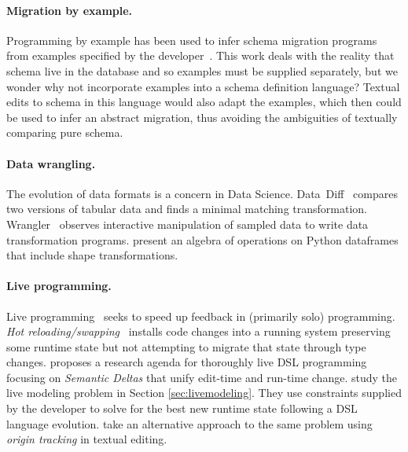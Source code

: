 \documentclass[english,submission]{programming}
\begin{document}
\paragraph{Migration by example.}
Programming by example has been used to infer schema migration programs from examples specified by the developer~\cite{wang20, Alexe11}.
This work deals with the reality that schema live in the database and so examples must be supplied separately, but we wonder why not incorporate examples into a schema definition language? Textual edits to schema in this language would also adapt the examples, which then could be used to infer an abstract migration, thus avoiding the ambiguities of textually comparing pure schema.

\paragraph{Data wrangling.} The evolution of data formats is a concern in Data Science. Data~Diff~\cite{sutton18} compares two versions of tabular data and finds a minimal matching transformation.
Wrangler~\cite{kandel11} observes interactive manipulation of sampled data to write data transformation programs.
\citet{petersohn20} present an algebra of operations on Python dataframes that include shape transformations.

\paragraph{Live programming.}
Live programming~\cite{tanimoto90, rein2018exploratory} seeks to speed up feedback in (primarily solo) programming.
\emph{Hot reloading/swapping}~\cite{barenz2020essence, hicks2005dynamic} installs code changes into a running system preserving some runtime state but not attempting to migrate that state through type changes.
\citet{SemanticDeltas} proposes a research agenda for thoroughly live DSL programming focusing on \emph{Semantic Deltas} that unify edit-time and run-time change.
\citet{RuntimeConstraint} study the live modeling problem in Section \ref{sec:livemodeling}. They use constraints supplied by the developer to solve for the best new runtime state following a DSL language evolution. \citet{vanRozen19} take an alternative approach to the same problem using \emph{origin tracking} in textual editing.


\end{document}
